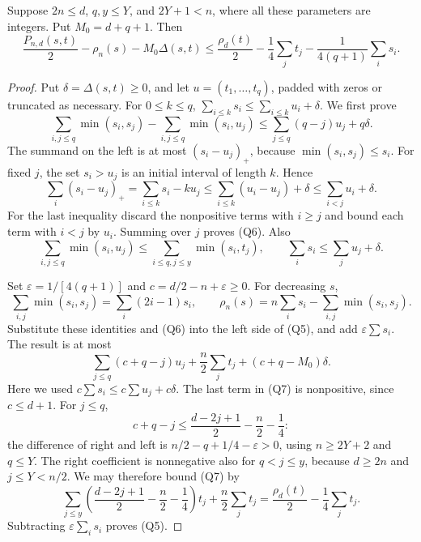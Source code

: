 \begin{srlemma}
\label{lem:sr-theta-square-majorization}
Suppose \(2n\le d\), \(q,y\le Y\), and \(2Y+1<n\), where all these
parameters are integers. Put \(M_0=d+q+1\).
Then
\[
 \frac{P_{n,d}(s,t)}2-\rho_n(s)-M_0\Delta(s,t)
 \le \frac{\rho_d(t)}2-\frac14\sum_jt_j
                 -\frac1{4(q+1)}\sum_i s_i .
 \tag{Q5}\label{eq:sr-theta-square-exponent}
\]
\end{srlemma}

\begin{proof}
Put \(\delta=\Delta(s,t)\ge0\), and let
\(u=(t_1,\ldots,t_q)\), padded with zeros or truncated as necessary.
For \(0\le k\le q\),
\(\sum_{i\le k}s_i\le\sum_{i\le k}u_i+\delta\).
We first prove
\[
 \sum_{i,j\le q}\min(s_i,s_j)
      -\sum_{i,j\le q}\min(s_i,u_j)
       \le\sum_{j\le q}(q-j)u_j+q\delta .
 \tag{Q6}\label{eq:sr-theta-square-minimum-slack}
\]
The summand on the left is at most \((s_i-u_j)_+\), because
\(\min(s_i,s_j)\le s_i\).
For fixed \(j\), the set \(s_i>u_j\) is an initial interval of length
\(k\). Hence
\[
 \sum_i(s_i-u_j)_+
  =\sum_{i\le k}s_i-ku_j
  \le\sum_{i\le k}(u_i-u_j)+\delta
  \le\sum_{i<j}u_i+\delta.
\]
For the last inequality discard the nonpositive terms with \(i\ge j\)
and bound each term with \(i<j\) by \(u_i\).
Summing over \(j\) proves (Q6).
Also
\[
 \sum_{i,j\le q}\min(s_i,u_j)
      \le\sum_{i\le q,j\le y}\min(s_i,t_j),
 \qquad
 \sum_i s_i\le\sum_j u_j+\delta .
\]

Set \(\varepsilon=1/[4(q+1)]\) and \(c=d/2-n+\varepsilon\ge0\).
For decreasing \(s\),
\[
 \sum_{i,j}\min(s_i,s_j)=\sum_i(2i-1)s_i,
 \qquad
 \rho_n(s)=n\sum_i s_i-\sum_{i,j}\min(s_i,s_j).
\]
Substitute these identities and (Q6) into the left side of (Q5),
and add \(\varepsilon\sum s_i\).
The result is at most
\[
 \sum_{j\le q}(c+q-j)u_j
       +\frac n2\sum_jt_j
       +(c+q-M_0)\delta .
 \tag{Q7}\label{eq:sr-theta-square-intermediate}
\]
Here we used \(c\sum s_i\le c\sum u_j+c\delta\).
The last term in (Q7) is nonpositive, since \(c\le d+1\).
For \(j\le q\),
\[
 c+q-j\le
       \frac{d-2j+1}2-\frac n2-\frac14:
\]
the difference of right and left is
\(n/2-q+1/4-\varepsilon>0\), using \(n\ge2Y+2\) and \(q\le Y\).
The right coefficient is nonnegative also for \(q<j\le y\),
because \(d\ge2n\) and \(j\le Y<n/2\).
We may therefore bound (Q7) by
\[
 \sum_{j\le y}
       \left(\frac{d-2j+1}2-\frac n2-\frac14\right)t_j
          +\frac n2\sum_jt_j
     =\frac{\rho_d(t)}2-\frac14\sum_jt_j .
\]
Subtracting \(\varepsilon\sum_i s_i\) proves (Q5).
\end{proof}

